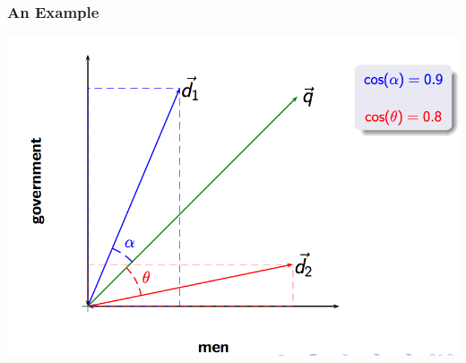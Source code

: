 \documentclass[svgnames]{beamer}
\begin{document}

\begin{frame}
  \frametitle{An Example}

  \begin{center}
    \includegraphics[width=.8\linewidth]{VSM-cosenos.png}\\
  \end{center}

\end{frame}




\end{document}
